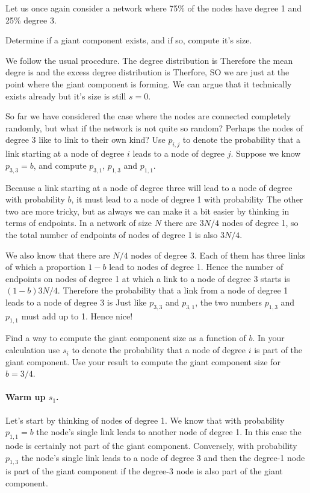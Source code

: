 Let us once again consider a network where 75\% of the nodes have degree 1 and 25\% degree 3. 

\subquestion 
Determine if a giant component exists, and if so, compute it's size.

\solution
We follow the usual procedure. The degree distribution is 
Therefore the mean degre is 
and the excess degree distribution is 
Therfore,
SO we are just at the point where the giant component is forming. We can argue that it technically exists already but it's size is still 
$s=0$.

\subquestion
So far we have considered the case where the nodes are connected completely randomly, but what if the network is not quite so random? Perhaps the nodes of degree 3 like to link to their own kind? Use $p_{i,j}$ to denote the probability that a link starting at a node of degree $i$ leads to a node of degree $j$. Suppose we know $p_{3,3}=b$, and compute $p_{3,1}$, $p_{1,3}$ and $p_{1,1}$.

\solution
Because a link starting at a node of degree three will lead to a node of degree with probability $b$, it must lead to a node of degree 1 with probability 
The other two are more tricky, but as always we can make it a bit easier by thinking in terms of endpoints. In a network of size $N$ there are $3N/4$ nodes of degree 1, so the total number of endpoints of nodes of degree 1 is also $3N/4$. 

We also know that there are $N/4$ nodes of degree 3. Each of them has three links of which a proportion $1-b$ lead to nodes of degree 1. Hence the number of endpoints on nodes of degree 1 at which a link to a node of degree 3 starts is $(1-b)3N/4$. Therefore the probability that a link from a node of degree 1 leads to a node of degree 3 is 
Just like $p_{3,3}$ and $p_{3,1}$, the two numbers $p_{1,3}$ and $p_{1,1}$ must add up to 1. Hence 
nice!

\subquestion 
Find a way to compute the giant component size as a function of $b$. In your calculation use $s_i$ to denote the probability that a node of degree $i$ is part of the giant component. Use your result to compute the giant component size for $b=3/4$.

\solution
 \paragraph{Warm up $s_1$.}Let's start by thinking of nodes of degree 1. We know that with probability $p_{1,1}=b$ the node's single link leads to another node of degree 1. In this case the node is certainly not part of the giant component. Conversely, with probability $p_{1,3}$ the node's single link leads to a node of degree 3 and then the degree-1 node is part of the giant component if the degree-3 node is also part of the giant component. 
 
